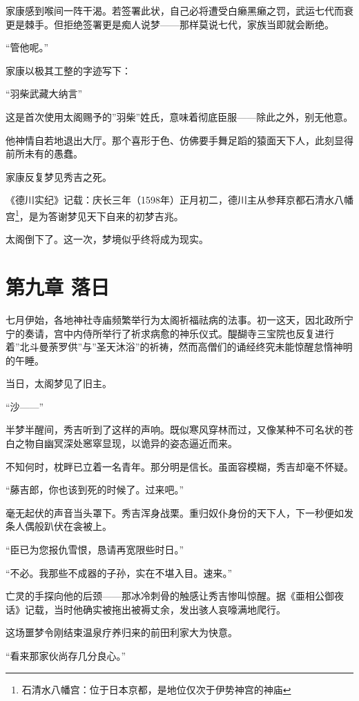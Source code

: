 \documentclass[
]{book}
\begin{document}
家康感到喉间一阵干渴。若签署此状，自己必将遭受白癞黑癞之罚，武运七代而衰更是棘手。但拒绝签署更是痴人说梦------那样莫说七代，家族当即就会断绝。

``管他呢。''

家康以极其工整的字迹写下：

``羽柴武藏大纳言''

这是首次使用太阁赐予的''羽柴''姓氏，意味着彻底臣服------除此之外，别无他意。

他神情自若地退出大厅。那个喜形于色、仿佛要手舞足蹈的猿面天下人，此刻显得前所未有的愚蠢。

家康反复梦见秀吉之死。

《德川实纪》记载：庆长三年（1598年）正月初二，德川主从参拜京都石清水八幡宫\footnote{石清水八幡宫：位于日本京都，是地位仅次于伊势神宫的神庙}，是为答谢梦见天下自来的初梦吉兆。

太阁倒下了。这一次，梦境似乎终将成为现实。

\chapter*{第九章 落日}\label{ux7b2cux4e5dux7ae0-ux843dux65e5}

七月伊始，各地神社寺庙频繁举行为太阁祈福祛病的法事。初一这天，因北政所宁宁的奏请，宫中内侍所举行了祈求病愈的神乐仪式。醍醐寺三宝院也反复进行着''北斗曼荼罗供''与''圣天沐浴''的祈祷，然而高僧们的诵经终究未能惊醒怠惰神明的午睡。

当日，太阁梦见了旧主。

``沙------''

半梦半醒间，秀吉听到了这样的声响。既似寒风穿林而过，又像某种不可名状的苍白之物自幽冥深处窸窣显现，以诡异的姿态逼近而来。

不知何时，枕畔已立着一名青年。那分明是信长。虽面容模糊，秀吉却毫不怀疑。

``藤吉郎，你也该到死的时候了。过来吧。''

毫无起伏的声音当头罩下。秀吉浑身战栗。重归奴仆身份的天下人，下一秒便如发条人偶般趴伏在衾被上。

``臣已为您报仇雪恨，恳请再宽限些时日。''

``不必。我那些不成器的子孙，实在不堪入目。速来。''

亡灵的手探向他的后颈------那冰冷刺骨的触感让秀吉惨叫惊醒。据《亜相公御夜话》记载，当时他确实被拖出被褥丈余，发出骇人哀嚎满地爬行。

这场噩梦令刚结束温泉疗养归来的前田利家大为快意。

``看来那家伙尚存几分良心。''
\end{document}
